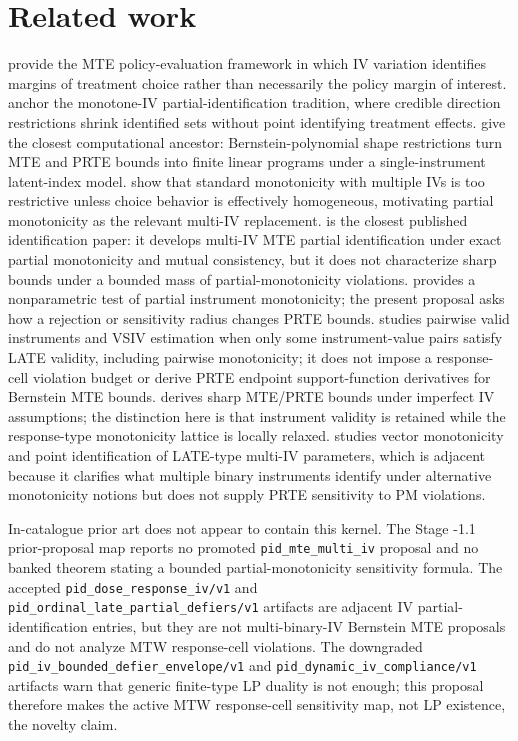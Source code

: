 \documentclass[11pt]{article}
\theoremstyle{definition}
\theoremstyle{plain}
\theoremstyle{remark}
\begin{document}
\section{Related work}
\citet{HeckmanVytlacil2005} provide the MTE policy-evaluation framework in which IV variation identifies margins of treatment choice rather than necessarily the policy margin of interest.  \citet{ManskiPepper2000} anchor the monotone-IV partial-identification tradition, where credible direction restrictions shrink identified sets without point identifying treatment effects.  \citet{MogstadSantosTorgovitsky2018} give the closest computational ancestor: Bernstein-polynomial shape restrictions turn MTE and PRTE bounds into finite linear programs under a single-instrument latent-index model.  \citet{MogstadTorgovitskyWalters2021} show that standard monotonicity with multiple IVs is too restrictive unless choice behavior is effectively homogeneous, motivating partial monotonicity as the relevant multi-IV replacement.  \citet{MogstadTorgovitskyWalters2024} is the closest published identification paper: it develops multi-IV MTE partial identification under exact partial monotonicity and mutual consistency, but it does not characterize sharp bounds under a bounded mass of partial-monotonicity violations.  \citet{JiangSun2023} provides a nonparametric test of partial instrument monotonicity; the present proposal asks how a rejection or sensitivity radius changes PRTE bounds.  \citet{SunWuthrich2025} studies pairwise valid instruments and VSIV estimation when only some instrument-value pairs satisfy LATE validity, including pairwise monotonicity; it does not impose a response-cell violation budget or derive PRTE endpoint support-function derivatives for Bernstein MTE bounds.  \citet{MourifieWan2025} derives sharp MTE/PRTE bounds under imperfect IV assumptions; the distinction here is that instrument validity is retained while the response-type monotonicity lattice is locally relaxed.  \citet{Goff2024} studies vector monotonicity and point identification of LATE-type multi-IV parameters, which is adjacent because it clarifies what multiple binary instruments identify under alternative monotonicity notions but does not supply PRTE sensitivity to PM violations.

In-catalogue prior art does not appear to contain this kernel.  The Stage -1.1 prior-proposal map reports no promoted \texttt{pid\_mte\_multi\_iv} proposal and no banked theorem stating a bounded partial-monotonicity sensitivity formula.  The accepted \texttt{pid\_dose\_response\_iv/v1} and \texttt{pid\_ordinal\_late\_partial\_defiers/v1} artifacts are adjacent IV partial-identification entries, but they are not multi-binary-IV Bernstein MTE proposals and do not analyze MTW response-cell violations.  The downgraded \texttt{pid\_iv\_bounded\_defier\_envelope/v1} and \texttt{pid\_dynamic\_iv\_compliance/v1} artifacts warn that generic finite-type LP duality is not enough; this proposal therefore makes the active MTW response-cell sensitivity map, not LP existence, the novelty claim.
\end{document}
